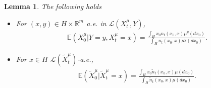 \documentclass[10pt]{article} %
\newcommand{\E}{\mathbb{E}}
\newcommand{\R}{\mathbb{R}}
\theoremstyle{plain}
\newtheorem{lemma}[theorem]{Lemma}
\theoremstyle{definition}
\theoremstyle{remark}
\renewcommand{\L}{\mathscr{L}}
\newcommand{\norm}[1]{\left\|#1\right\|}
\newcommand{\C}{\mathcal C}
\newcommand{\N}{\mathcal N}
\begin{document}
\begin{lemma}\label{lem: tranisition kernels}
    The following holds
    \begin{itemize}
    \item[(i)] For $(x,y) \in H \times \R^m$ a.e. in $\L(X_t^\mu, Y)$, 
    \begin{eqnarray*}
        \E(X^{\mu}_0 | Y = y, X^{\mu}_t = x) = \frac{\int_H x_0 n_t(x_0, x) \mu^y(dx_0)}{\int_H n_t(x_0, x) \mu^y(dx_0)}.
    \end{eqnarray*} 
    \item[(ii)] For $x\in H$ $\L(\widetilde{X}_t^{\mu})$-a.e.,
    \begin{eqnarray*}
        \E(\widetilde{X}^{\mu}_0 |\widetilde{X}^{\mu}_t = x) = \frac{\int_H x_0 \tilde n_t(x_0, x) \mu(dx_0)}{\int_H \tilde n_t(x_0, x) \mu(dx_0)}.
    \end{eqnarray*}
    \end{itemize}
\end{lemma}
\end{document}
